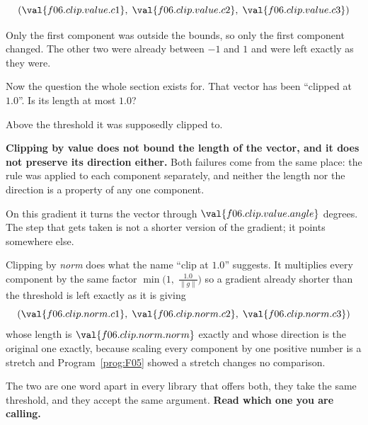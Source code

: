 \begin{fr}
\begin{ansblock}
\[ (\val{f06.clip.value.c1},\; \val{f06.clip.value.c2},\;
   \val{f06.clip.value.c3}) \]
\end{ansblock}

Only the first component was outside the bounds, so only the first component
changed. The other two were already between $-1$ and $1$ and were left exactly
as they were.

Now the question the whole section exists for. That vector has been
\enquote{clipped at $\num{1.0}$}. Is its length at most $\num{1.0}$?
\dotline
\nextframe
\end{fr}

\begin{fr}
Above the threshold it was supposedly clipped to.

\begin{trapbox}
\textbf{Clipping by value does not bound the length of the vector, and it does
not preserve its direction either.} Both failures come from the same place:
the rule was applied to each component separately, and neither the length nor
the direction is a property of any one component.

On this gradient it turns the vector through
$\val{f06.clip.value.angle}$ degrees. The step that gets taken is not a
shorter version of the gradient; it points somewhere else.

Clipping by \emph{norm} does what the name \enquote{clip at $\num{1.0}$}
suggests. It multiplies every component by the same factor
$\min\bigl(1,\; \frac{\num{1.0}}{\lVert g \rVert}\bigr)$ \dash{} so a gradient
already shorter than the threshold is left exactly as it is \dash{} giving
\[ (\val{f06.clip.norm.c1},\; \val{f06.clip.norm.c2},\;
   \val{f06.clip.norm.c3}) \]
whose length is $\val{f06.clip.norm.norm}$ exactly and whose direction is the
original one exactly, because scaling every component by one positive number
is a stretch and Program~\ref{prog:F05} showed a stretch changes no
comparison.

The two are one word apart in every library that offers both, they take the
same threshold, and they accept the same argument. \textbf{Read which one you
are calling.}
\end{trapbox}
\end{fr}

